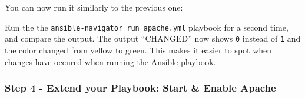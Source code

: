You can now run it similarly to the previous one:

\begin{Shaded}
\begin{Highlighting}[]
\ExtensionTok{[student@controller}\NormalTok{ \textasciitilde{}]$ ansible{-}navigator run package.yml }
\end{Highlighting}
\end{Shaded}

\begin{Shaded}
\begin{Highlighting}[]

\PreprocessorTok{**********************************************************}

\PreprocessorTok{*********************************************************}
 \PreprocessorTok{[}\PreprocessorTok{]}

\PreprocessorTok{************************************************}
 \PreprocessorTok{[}\PreprocessorTok{]}

\PreprocessorTok{*************************************}
 \PreprocessorTok{[}\PreprocessorTok{]}\NormalTok{ =}\OperatorTok{\textgreater{}}\NormalTok{ \{}
    \ExtensionTok{:} 
\NormalTok{\}}

\PreprocessorTok{*********************************************************************}
\end{Highlighting}
\end{Shaded}

Run the the \texttt{ansible-navigator\ run\ apache.yml} playbook for a
second time, and compare the output. The output ``CHANGED'' now shows
\texttt{0} instead of \texttt{1} and the color changed from yellow to
green. This makes it easier to spot when changes have occured when
running the Ansible playbook.

\hypertarget{step-4---extend-your-playbook-start-enable-apache}{%
\subsubsection{Step 4 - Extend your Playbook: Start \& Enable
Apache}\label{step-4---extend-your-playbook-start-enable-apache}}


